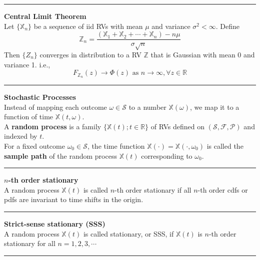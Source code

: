 \documentclass{article}
\renewcommand{\S}{\mathcal{S}}
\renewcommand{\P}{\mathcal{P}}
\providecommand{\F}{\mathcal{F}}
\providecommand{\X}{\mathbb{X}}
\providecommand{\Z}{\mathbb{Z}}
\providecommand{\R}{\mathbb{R}}
\begin{document}
\begin{multicols*}{3}
        \noindent\rule{\columnwidth}{0.4pt}

        \textbf{Central Limit Theorem}\\
        Let $\{\X_n\}$ be a sequence of iid RVs with mean $\mu$ and variance $\sigma^2<\infty$.
        Define
        \begin{equation*}
            \Z_n = \frac{(\X_1 + \X_2 + \cdots + \X_n) - n\mu}{\sigma\sqrt{n}}
        \end{equation*}
        Then $\{Z_n\}$ converges in distribution to a RV $\Z$ that is Gaussian with mean 0 and variance 1.
        i.e.,
        \begin{equation*}
            F_{\Z_n}(z)\rightarrow\Phi(z)\text{ as }n\rightarrow\infty,\forall z\in\R
        \end{equation*}

        \noindent\rule{\columnwidth}{0.4pt}

        \textbf{Stochastic Processes}\\
        Instead of mapping each outcome $\omega\in\S$ to a number $\X(\omega)$, we map it to a function of time $\X(t,\omega)$.\\
        A \textbf{random process} is a family $\{\X(t); t\in\R\}$ of RVs defined on $(\S,\F,\P)$ and indexed by $t$.\\
        For a fixed outcome $\omega_0\in\S$, the time function $\X(\cdot) = \X(\cdot, \omega_0)$ is called the \textbf{sample path} of the random process $\X(t)$ corresponding to $\omega_0$.

        \noindent\rule{\columnwidth}{0.4pt}

        \textbf{$n$-th order stationary}\\
        A random process $\X(t)$ is called $n$-th order stationary if all $n$-th order cdfs or pdfs are invariant to time shifts in the origin.\\

        \noindent\rule{\columnwidth}{0.4pt}

        \textbf{Strict-sense stationary (SSS)}\\
        A random process $\X(t)$ is called stationary, or SSS, if $\X(t)$ is $n$-th order stationary for all $n=1,2,3,\cdots$

        \noindent\rule{\columnwidth}{0.4pt}


\end{multicols*}
\end{document}
